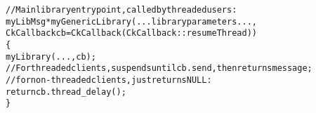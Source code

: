 \begin{alltt}
//Main library entry point, called by threaded users:
myLibMsg *myGenericLibrary(...library parameters...,
  CkCallback cb=CkCallback(CkCallback::resumeThread)) 
\{
  myLibrary(...,cb);
  //For threaded clients, suspends until cb.send, then returns message;
  // for non-threaded clients, just returns NULL:
  return cb.thread\_delay(); 
\}
\end{alltt}










